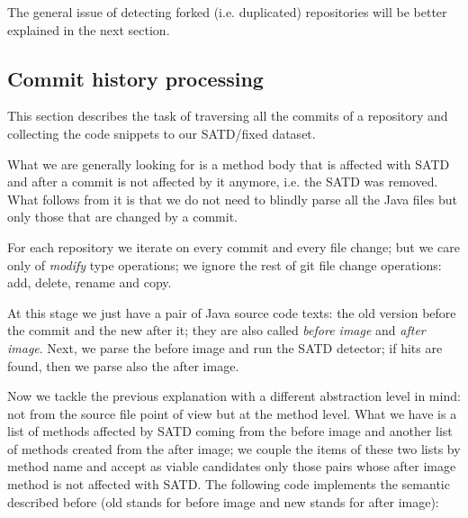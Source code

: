 The general issue of detecting forked (i.e. duplicated) repositories will be better explained in the next section.



\subsection{Commit history processing}

This section describes the task of traversing all the commits of a repository and collecting the code snippets to our SATD/fixed dataset.

What we are generally looking for is a method body that is affected with SATD and after a commit is not affected by it anymore, i.e. the SATD was removed. What follows from it is that we do not need to blindly parse all the Java files but only those that are changed by a commit.

For each repository we iterate on every commit and every file change; but we care only of \textit{modify} type operations; we ignore the rest of git file change operations: add, delete, rename and copy.

At this stage we just have a pair of Java source code texts: the old version before the commit and the new after it; they are also called \textit{before image} and \textit{after image}. Next, we parse the before image and run the SATD detector; if hits are found, then we parse also the after image.

Now we tackle the previous explanation with a different abstraction level in mind: not from the source file point of view but at the method level. 
What we have is a list of methods affected by SATD coming from the before image and another list of methods created from the after image; we couple the items of these two lists by method name and accept as viable candidates only those pairs whose after image method is not affected with SATD. The following code implements the semantic described before (old stands for before image and new stands for after image):

\begin{center}
\end{center}

